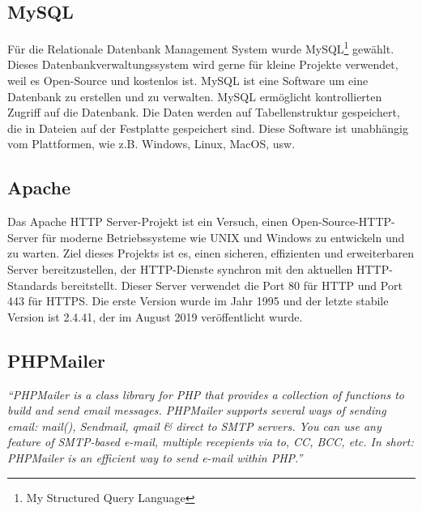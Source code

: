 \subsection{MySQL}

F\"{u}r die Relationale Datenbank Management System wurde MySQL\footnote{My Structured Query Language} gew\"{a}hlt. Dieses Datenbankverwaltungssystem wird gerne f\"{u}r kleine Projekte verwendet, weil es Open-Source und kostenlos ist. MySQL ist eine Software um eine Datenbank zu erstellen und zu verwalten. MySQL erm\"{o}glicht kontrollierten Zugriff auf die Datenbank. Die Daten werden auf Tabellenstruktur gespeichert, die in Dateien auf der Festplatte gespeichert sind. Diese Software ist unabh\"angig vom Plattformen, wie z.B. Windows, Linux, MacOS, usw. \cite{40_mysql1}


\subsection{Apache}

Das Apache HTTP Server-Projekt ist ein Versuch, einen Open-Source-HTTP-Server f\"{u}r moderne Betriebssysteme wie UNIX und Windows zu entwickeln und zu warten. Ziel dieses Projekts ist es, einen sicheren, effizienten und erweiterbaren Server bereitzustellen, der HTTP-Dienste synchron mit den aktuellen HTTP-Standards bereitstellt. Dieser Server verwendet die Port 80 f\"{u}r HTTP und Port 443 f\"{u}r HTTPS. Die erste Version wurde im Jahr 1995 und der letzte stabile Version ist 2.4.41, der im August 2019 ver\"{o}ffentlicht wurde. \cite{40_apache}


\subsection{PHPMailer}
\textit{``PHPMailer is a class library for PHP that provides a collection of functions to build and send email messages. PHPMailer supports several ways of sending email: mail(), Sendmail, qmail \& direct to SMTP servers. You can use any feature of SMTP-based e-mail, multiple recepients via to, CC, BCC, etc. In short: PHPMailer is an efficient way to send e-mail within PHP.''} \cite{40_phpmailer}



